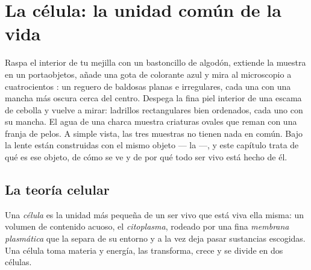 \chapter{La célula: la unidad común de la vida}\label{ch:g10:cells-common-unit}

Raspa el interior de tu mejilla con un bastoncillo de algodón, extiende
la muestra en un portaobjetos, añade una gota de colorante azul y mira
al microscopio a cuatrocientos : un reguero de baldosas planas
e irregulares, cada una con una mancha más oscura cerca del centro.
Despega la fina piel interior de una escama de cebolla y vuelve a
mirar: ladrillos rectangulares bien ordenados, cada uno con su mancha.
El agua de una charca muestra criaturas ovales que reman con una franja
de pelos. A simple vista, las tres muestras no tienen nada en común.
Bajo la lente están construidas con el mismo objeto --- la  ---, y
este capítulo trata de qué es ese objeto, de cómo se ve y de por qué
todo ser vivo está hecho de él.

\section{La teoría celular}

\begin{definition}[Célula]\label{def:g10:cells-common-unit:cell}
Una \emph{célula} es la unidad más pequeña de un ser vivo
que está viva ella misma: un volumen de contenido acuoso, el
\emph{citoplasma}, rodeado por una fina
\emph{membrana plasmática} que la separa de
su entorno y a la vez deja pasar sustancias escogidas. Una célula toma
materia y energía, las transforma, crece y se divide en dos células.
\end{definition}

